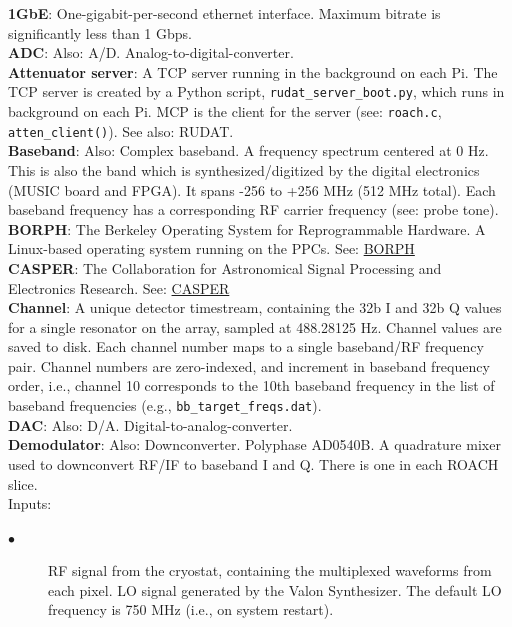 \noindent
\textbf{1GbE}: One-gigabit-per-second ethernet interface. Maximum bitrate is significantly less than 1 Gbps.\\
\textbf{ADC}: Also: A/D. Analog-to-digital-converter.\\
\textbf{Attenuator server}: A TCP server running in the background on each Pi. The TCP server is created by a Python script, \texttt{rudat\_server\_boot.py}, which runs in background on each Pi. MCP is the client for the server (see: \texttt{roach.c}, \texttt{atten\_client()}). See also: RUDAT.\\
\textbf{Baseband}: Also: Complex baseband. A frequency spectrum centered at 0 Hz. This is also the band which is synthesized/digitized by the digital electronics (MUSIC board and FPGA). It spans -256 to +256 MHz (512 MHz total). Each baseband frequency has a corresponding RF carrier frequency (see: probe tone).\\
\textbf{BORPH}: The Berkeley Operating System for Reprogrammable Hardware. A Linux-based operating system running on the PPCs. See: \href{https://casper.ssl.berkeley.edu/wiki/BORPH}{BORPH}\\
\textbf{CASPER}: The Collaboration for Astronomical Signal Processing and Electronics Research. See: \href{https://casper.berkeley.edu}{CASPER}\\
\textbf{Channel}: A unique detector timestream, containing the 32b I and 32b Q values for a single resonator on the array, sampled at 488.28125 Hz. Channel values are saved to disk. Each channel number maps to a single baseband/RF frequency pair. Channel numbers are zero-indexed, and increment in baseband frequency order, i.e., channel 10 corresponds to the 10th baseband frequency in the list of baseband frequencies (e.g., \texttt{bb\_target\_freqs.dat}).\\
\textbf{DAC}: Also: D/A. Digital-to-analog-converter.\\
\textbf{Demodulator}: Also: Downconverter. Polyphase AD0540B. A quadrature mixer used to downconvert RF/IF to baseband I and Q. There is one in each ROACH slice.\\
Inputs:
\begin{description}
  \item[$\bullet$] RF signal from the cryostat, containing the multiplexed waveforms from each pixel. LO signal generated by the Valon Synthesizer. The default LO frequency is 750 MHz (i.e., on system restart).
\end{description}
